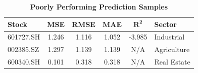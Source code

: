 \documentclass[3p,times,procedia]{elsarticle}
\begin{document}



\begin{table}[!ht]
\renewcommand{\arraystretch}{1.5} %
\centering
\large %
\caption{\textbf{Poorly Performing Prediction Samples}}
\begin{tabular}{|l|c|c|c|c|l|}
\hline
\textbf{Stock} & \textbf{MSE} & \textbf{RMSE} & \textbf{MAE} & \textbf{$\mathbf{R^2}$} & \textbf{Sector} \\
\hline
601727.SH & 1.246 & 1.116 & 1.052 & -3.985 & Industrial \\
002385.SZ & 1.297 & 1.139 & 1.139 & N/A    & Agriculture \\
600340.SH & 0.101 & 0.318 & 0.318 & N/A    & Real Estate \\
\hline
\end{tabular}
\end{table}

\end{document}
